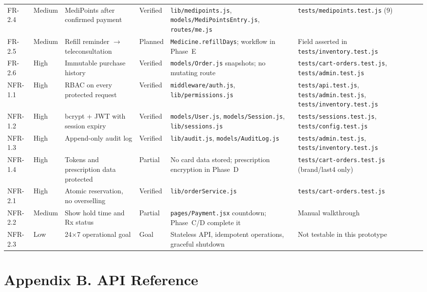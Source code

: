 \documentclass[11pt,a4paper]{article}
\begin{document}
{\begin{longtable}{@{}L{1.30cm}L{1.20cm}L{3.30cm}L{1.50cm}L{4.05cm}L{3.25cm}@{}}
FR-2.4 & Medium & MediPoints after confirmed payment & Verified & \texttt{lib/medipoints.js}, \texttt{models/MediPointsEntry.js}, \texttt{routes/me.js} & \texttt{tests/medipoints.test.js} (9)\\
FR-2.5 & Medium & Refill reminder $\rightarrow$ teleconsultation & Planned & \texttt{Medicine.refillDays}; workflow in Phase~E & Field asserted in \texttt{tests/inventory.test.js}\\
FR-2.6 & High & Immutable purchase history & Verified & \texttt{models/Order.js} snapshots; no mutating route & \texttt{tests/cart-orders.test.js}, \texttt{tests/admin.test.js}\\
NFR-1.1 & High & RBAC on every protected request & Verified & \texttt{middleware/auth.js}, \texttt{lib/permissions.js} & \texttt{tests/api.test.js}, \texttt{tests/admin.test.js}, \texttt{tests/inventory.test.js}\\
NFR-1.2 & High & bcrypt + JWT with session expiry & Verified & \texttt{models/User.js}, \texttt{models/Session.js}, \texttt{lib/sessions.js} & \texttt{tests/sessions.test.js}, \texttt{tests/config.test.js}\\
NFR-1.3 & High & Append-only audit log & Verified & \texttt{lib/audit.js}, \texttt{models/AuditLog.js} & \texttt{tests/admin.test.js}, \texttt{tests/inventory.test.js}\\
NFR-1.4 & High & Tokens and prescription data protected & Partial & No card data stored; prescription encryption in Phase~D & \texttt{tests/cart-orders.test.js} (brand/last4 only)\\
NFR-2.1 & High & Atomic reservation, no overselling & Verified & \texttt{lib/orderService.js} & \texttt{tests/cart-orders.test.js}\\
NFR-2.2 & Medium & Show hold time and Rx status & Partial & \texttt{pages/Payment.jsx} countdown; Phase~C/D complete it & Manual walkthrough\\
NFR-2.3 & Low & 24$\times$7 operational goal & Goal & Stateless API, idempotent operations, graceful shutdown & Not testable in this prototype\\
\end{longtable}
}

\clearpage
{}
\section*{Appendix B. API Reference}
\end{document}
